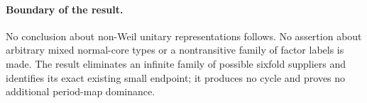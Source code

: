 \paragraph{Boundary of the result.}
No conclusion about non-Weil unitary representations follows.
No assertion about arbitrary mixed normal-core types or a
nontransitive family of factor labels is made. The result
eliminates an infinite family of possible sixfold suppliers
and identifies its exact existing small endpoint; it produces
no cycle and proves no additional period-map dominance.
